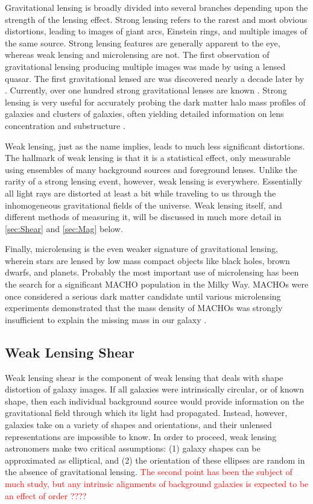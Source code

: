 Gravitational lensing is broadly divided into several branches depending upon the strength of the lensing effect. Strong lensing refers to the rarest and most obvious distortions, leading to images of giant arcs, Einstein rings, and multiple images of the same source. Strong lensing features are generally apparent to the eye, whereas weak lensing and microlensing are not. The first observation of gravitational lensing producing multiple images was made by \citet{Walsh79} using a lensed quasar. The first gravitational lensed arc was discovered nearly a decade later by \citet{Soucail88}. Currently, over one hundred strong gravitational lenses are known \citep{Browne03,Bolton08}. Strong lensing is very useful for accurately probing the dark matter halo mass profiles of galaxies and clusters of galaxies, often yielding detailed information on lens concentration \citep{Auger10} and substructure \citep{Mao98,Dalal02}. 

Weak lensing, just as the name implies, leads to much less significant distortions. The hallmark of weak lensing is that it is a statistical effect, only measurable using ensembles of many background sources and foreground lenses. Unlike the rarity of a strong lensing event, however, weak lensing is everywhere. Essentially all light rays are distorted at least a bit while traveling to us through the inhomogeneous gravitational fields of the universe. Weak lensing itself, and different methods of measuring it, will be discussed in much more detail in \autoref{sec:Shear} and \autoref{sec:Mag} below. 

Finally, microlensing is the even weaker signature of gravitational lensing, wherein stars are lensed by low mass compact objects like black holes, brown dwarfs, and planets. Probably the most important use of microlensing has been the search for a significant \acf{MACHO} population in the Milky Way. \ac{MACHO}s were once considered a serious dark matter candidate until various microlensing experiments demonstrated that the mass density of \ac{MACHO}s was strongly insufficient to explain the missing mass in our galaxy \citep{Paczynski96,Wyrzykowski11,Sumi13}.


\subsection{Weak Lensing Shear}
\label{sec:Shear}
Weak lensing shear is the component of weak lensing that deals with shape distortion of galaxy images. If all galaxies were intrinsically circular, or of known shape, then each individual background source would provide information on the gravitational field through which its light had propagated. Instead, however, galaxies take on a variety of shapes and orientations, and their unlensed representations are impossible to know. In order to proceed, weak lensing astronomers make two critical assumptions: (1) galaxy shapes can be approximated as elliptical, and (2) the orientation of these ellipses are random in the absence of gravitational lensing. \textcolor{red}{The second point has been the subject of much study, but any intrinsic alignments of background galaxies is expected to be an effect of order ????}




